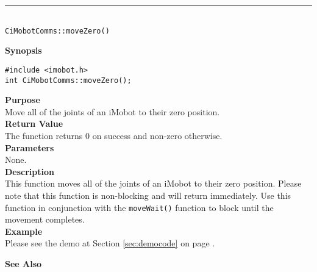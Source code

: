 \noindent
\vspace{5pt}
\rule{4.5in}{0.015in}\\
\noindent
{\LARGE \texttt{CiMobotComms::moveZero()}}\\
{}

\noindent
{\bf Synopsis}\\
\begin{verbatim}
#include <imobot.h>
int CiMobotComms::moveZero();
\end{verbatim}

\noindent
{\bf Purpose}\\
Move all of the joints of an iMobot to their zero position.\\

\noindent
{\bf Return Value}\\
The function returns 0 on success and non-zero otherwise.\\

\noindent
{\bf Parameters}\\
None.\\

\noindent
{\bf Description}\\
This function moves all of the joints of an iMobot to their zero position.
Please note that this function is non-blocking and will return immediately. Use
this function in conjunction with the \texttt{moveWait()} function to block
until the movement completes.\\

\noindent
{\bf Example}\\
Please see the demo at Section \ref{sec:democode} on page \pageref{sec:democode}.\\
\noindent

\noindent
{\bf See Also}\\

